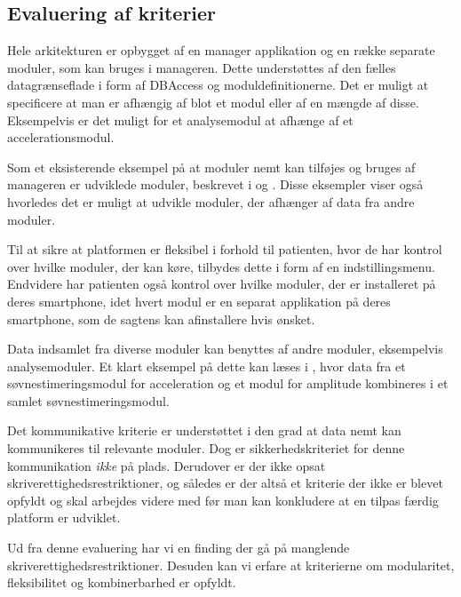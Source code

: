\subsection{Evaluering af kriterier}
\begin{description}[style=nextline]
	\item[Modulær]
	Hele arkitekturen er opbygget af en manager applikation og en række separate moduler, som kan bruges i manageren.
	Dette understøttes af den fælles datagrænseflade i form af DBAccess og moduldefinitionerne.  
	Det er muligt at specificere at man er afhængig af blot et modul eller af en mængde af disse.
	Eksempelvis er det muligt for et analysemodul at afhænge af et accelerationsmodul.
	
	Som et eksisterende eksempel på at moduler nemt kan tilføjes og bruges af manageren er udviklede moduler, beskrevet i \citet{misc:soevnrapp} og \citet{misc:surveyrapp}.
	Disse eksempler viser også hvorledes det er muligt at udvikle moduler, der afhænger af data fra andre moduler.
	
	\item[Fleksibilitet]
	Til at sikre at platformen er fleksibel i forhold til patienten, hvor de har kontrol over hvilke moduler, der kan køre, tilbydes dette i form af en indstillingsmenu.
	Endvidere har patienten også kontrol over hvilke moduler, der er installeret på deres smartphone, idet hvert modul er en separat applikation på deres smartphone, som de sagtens kan afinstallere hvis ønsket.
	
	\item[Kombinerbar]
	Data indsamlet fra diverse moduler kan benyttes af andre moduler, eksempelvis analysemoduler.
	Et klart eksempel på dette kan læses i \citet{misc:soevnrapp}, hvor data fra et søvnestimeringsmodul for acceleration og et modul for amplitude kombineres i et samlet søvnestimeringsmodul.
	
	\item[Kommunikativ]
	Det kommunikative kriterie er understøttet i den grad at data nemt kan kommunikeres til relevante moduler.
	Dog er sikkerhedskriteriet for denne kommunikation \textit{ikke} på plads.
	Derudover er der ikke opsat skriverettighedsrestriktioner, og således er der altså et kriterie der ikke er blevet opfyldt og skal arbejdes videre med før man kan konkludere at en tilpas færdig platform er udviklet.
\end{description}
Ud fra denne evaluering har vi en finding der gå på manglende skriverettighedsrestriktioner.
Desuden kan vi erfare at kriterierne om modularitet, fleksibilitet og kombinerbarhed er opfyldt.
